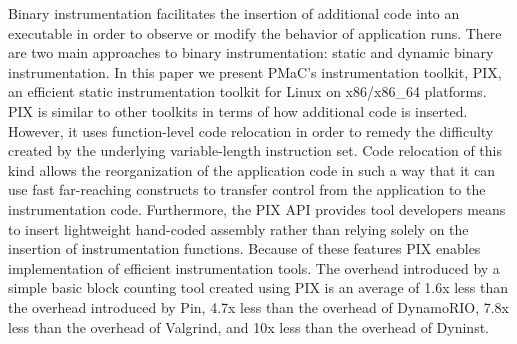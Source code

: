 \begin{it}

Binary instrumentation facilitates the insertion of additional code into an
executable in order to observe or modify the behavior of application runs. 
There are two main approaches to binary instrumentation: static and dynamic
binary instrumentation. In this paper we present PMaC's instrumentation toolkit, PIX, 
an efficient static instrumentation toolkit for Linux on x86/x86\_64 platforms. PIX
is similar to  other toolkits in terms of how additional code is inserted. However, it uses function-level
code relocation in order to remedy the difficulty created by the underlying variable-length instruction set. 
Code relocation of this kind allows the reorganization of the application code in such a way that it
can use fast far-reaching constructs to transfer control
from the application to the instrumentation code. Furthermore, the PIX API provides 
tool developers means to insert lightweight hand-coded assembly
rather than relying solely on the insertion of instrumentation functions.
Because of these features PIX enables implementation of efficient instrumentation tools. 
The overhead introduced by a simple basic block counting tool created using PIX is an
average of 1.6x less than the overhead introduced by Pin, 4.7x less than the overhead of
DynamoRIO, 7.8x less than the overhead of Valgrind, and 10x less than the overhead of Dyninst.

\end{it}
